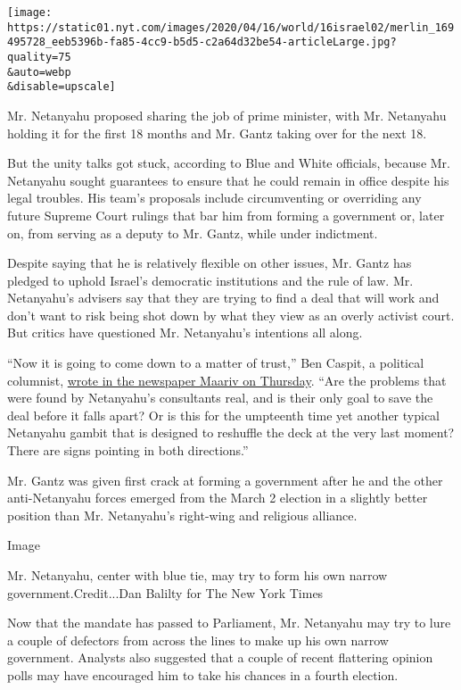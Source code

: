 \texttt{[image: https://static01.nyt.com/images/2020/04/16/world/16israel02/merlin\_169495728\_eeb5396b-fa85-4cc9-b5d5-c2a64d32be54-articleLarge.jpg?quality=75\\\&auto=webp\\\&disable=upscale]}

Mr. Netanyahu proposed sharing the job of prime minister, with Mr.
Netanyahu holding it for the first 18 months and Mr. Gantz taking over
for the next 18.

But the unity talks got stuck, according to Blue and White officials,
because Mr. Netanyahu sought guarantees to ensure that he could remain
in office despite his legal troubles. His team's proposals include
circumventing or overriding any future Supreme Court rulings that bar
him from forming a government or, later on, from serving as a deputy to
Mr. Gantz, while under indictment.

Despite saying that he is relatively flexible on other issues, Mr. Gantz
has pledged to uphold Israel's democratic institutions and the rule of
law. Mr. Netanyahu's advisers say that they are trying to find a deal
that will work and don't want to risk being shot down by what they view
as an overly activist court. But critics have questioned Mr. Netanyahu's
intentions all along.

``Now it is going to come down to a matter of trust,'' Ben Caspit, a
political columnist,
\href{https://www.maariv.co.il/journalists/Article-760128}{wrote in the
newspaper Maariv on Thursday}. ``Are the problems that were found by
Netanyahu's consultants real, and is their only goal to save the deal
before it falls apart? Or is this for the umpteenth time yet another
typical Netanyahu gambit that is designed to reshuffle the deck at the
very last moment? There are signs pointing in both directions.''

Mr. Gantz was given first crack at forming a government after he and the
other anti-Netanyahu forces emerged from the March 2 election in a
slightly better position than Mr. Netanyahu's right-wing and religious
alliance.

Image

Mr. Netanyahu, center with blue tie, may try to form his own narrow
government.Credit...Dan Balilty for The New York Times

Now that the mandate has passed to Parliament, Mr. Netanyahu may try to
lure a couple of defectors from across the lines to make up his own
narrow government. Analysts also suggested that a couple of recent
flattering opinion polls may have encouraged him to take his chances in
a fourth election.

